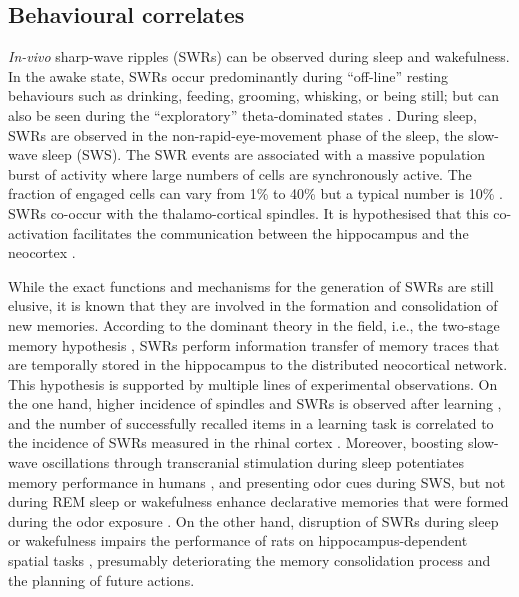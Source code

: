   \subsection{Behavioural correlates}
    {\it In-vivo} sharp-wave ripples (SWRs) can be observed during sleep and
    wakefulness. In the awake state, SWRs occur predominantly during ``off-line''
    resting behaviours such as drinking, feeding, grooming, whisking, or being
    still; but can also be seen during the ``exploratory'' theta-dominated states
    \citep{Oneill2006}. During sleep, SWRs are observed in the
    non-rapid-eye-movement phase of the sleep, the slow-wave sleep (SWS). The
    SWR events are associated with a massive population burst of activity
    where large numbers of cells are synchronously active. The fraction of
    engaged cells can vary from 1\% to 40\% but a typical number is 10\%
    \citep{Mizuseki2013}. SWRs co-occur with the thalamo-cortical spindles. It
    is hypothesised that this co-activation facilitates the communication
    between the hippocampus and the neocortex \citep{Sirota2003}.
    
    While the exact functions and mechanisms for the generation of SWRs are
    still elusive, it is known that they are involved in the formation and
    consolidation of new memories. According to the dominant theory in the
    field, i.e., the two-stage memory hypothesis \citep{Buzsaki1989}, SWRs
    perform information transfer of memory traces that are temporally stored in
    the hippocampus to the distributed neocortical network. This hypothesis is
    supported by multiple lines of experimental observations. On the one hand,
    higher incidence of spindles and SWRs is observed after learning
    \citep{Eschenko2006, Eschenko2008, Girardeau2014}, and the number of
    successfully recalled items in a learning task is correlated to the
    incidence of SWRs measured in the rhinal cortex
    \citep{Axmacher2008}. Moreover, boosting slow-wave oscillations through
    transcranial stimulation during sleep potentiates memory performance in
    humans \citep{Marshall2006}, and presenting odor cues during SWS, but not
    during REM sleep or wakefulness enhance declarative memories that were
    formed during the odor exposure \citep{Rasch2007}. On the other hand,
    disruption of SWRs during sleep or wakefulness impairs the performance of
    rats on hippocampus-dependent spatial tasks \citep{Girardeau2009,
    Jadhav2012}, presumably deteriorating the memory consolidation process and
    the planning of future actions.

